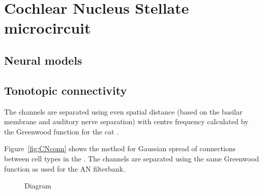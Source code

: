 \smallskip{}





\section{Cochlear Nucleus Stellate microcircuit}\label{sec:CN:cochl-nucl-stell}

\subsection{Neural models}



\smallskip{}

\subsection{Tonotopic connectivity}\label{sec:CN:tonot-conn}

The channels are separated using even spatial distance (based on the
basilar membrane and auditory nerve separation) with centre frequency
calculated by the Greenwood function for the cat
\citep{Greenwood:1990}. 

\smallskip{}

Figure~\ref{fig:CNconn} shows the method for Gaussian spread of
connections between cell types in the \CN\@.  The channels are separated
using the same Greenwood function as used for the AN filterbank.

\begin{figure}[tbh]
  \begin{center}
    \caption{Diagram}\label{fig:CNdiagram}
  \end{center}
\end{figure}



